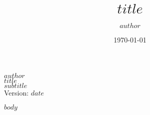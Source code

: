 \documentclass[11pt,a4paper]{report}
\title{$title$}
\author{$author$}
\date{\today \newpage}
\begin{document}

\cleardoublepage
\begin{titlepage}
    \centering
    \vfill
    {\small
        $author$\\
        \vskip1cm
        \bfseries
        \Huge
        $title$\\
        \huge
        $subtitle$\\
        \vskip1cm
    }
    {\Large
        Version: $date$\\
        \vskip0.5cm
    }     
    \vfill
\end{titlepage}

{
\hypersetup{linkcolor=black}
\setcounter{tocdepth}{6}
\tableofcontents
\newpage
}
\newpage
\setcounter{page}{1}
\setcounter{secnumdepth}{-1}


% 
%

$body$

% 
%
\newpage

\printbibliography[]


% 
% 

% 
%

% 
%


\end{document}
